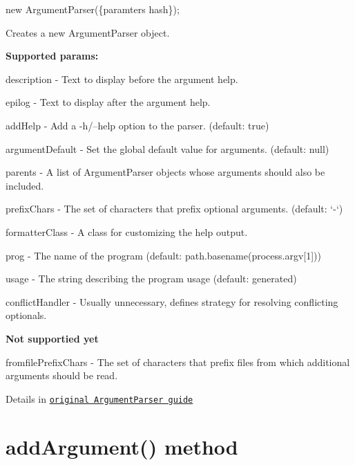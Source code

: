 \begin{DoxyCode}
new ArgumentParser(\{paramters hash\});
\end{DoxyCode}


Creates a new Argument\+Parser object.

{\bfseries Supported params\+:}


\begin{DoxyItemize}
\item {\ttfamily description} -\/ Text to display before the argument help.
\item {\ttfamily epilog} -\/ Text to display after the argument help.
\item {\ttfamily add\+Help} -\/ Add a -\/h/–help option to the parser. (default\+: true)
\item {\ttfamily argument\+Default} -\/ Set the global default value for arguments. (default\+: null)
\item {\ttfamily parents} -\/ A list of Argument\+Parser objects whose arguments should also be included.
\item {\ttfamily prefix\+Chars} -\/ The set of characters that prefix optional arguments. (default\+: ‘-\/‘)
\item {\ttfamily formatter\+Class} -\/ A class for customizing the help output.
\item {\ttfamily prog} -\/ The name of the program (default\+: {\ttfamily path.\+basename(process.\+argv\mbox{[}1\mbox{]})})
\item {\ttfamily usage} -\/ The string describing the program usage (default\+: generated)
\item {\ttfamily conflict\+Handler} -\/ Usually unnecessary, defines strategy for resolving conflicting optionals.
\end{DoxyItemize}

{\bfseries Not supportied yet}


\begin{DoxyItemize}
\item {\ttfamily fromfile\+Prefix\+Chars} -\/ The set of characters that prefix files from which additional arguments should be read.
\end{DoxyItemize}

Details in \href{http://docs.python.org/dev/library/argparse.html#argumentparser-objects}{\tt original Argument\+Parser guide}

\section*{add\+Argument() method }


